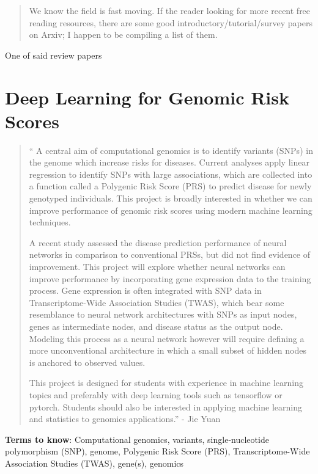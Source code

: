 \begin{quote}
We know the field is fast moving. If the reader looking for more recent free reading resources, there are some good introductory/tutorial/survey papers on Arxiv; I happen to be compiling a list of them.
\end{quote}

 One of said review papers \cite{raghu2020survey}

\cite[hello]{raghu2020survey}

\section{Deep Learning for Genomic Risk Scores}

\begin{quotation}
``
A central aim of computational genomics is to identify variants (SNPs) in the genome which increase risks for diseases. Current analyses apply linear regression to identify SNPs with large associations, which are collected into a function called a Polygenic Risk Score (PRS) to predict disease for newly genotyped individuals. This project is broadly interested in whether we can improve performance of genomic risk scores using modern machine learning techniques.

A recent study assessed the disease prediction performance of neural networks in comparison to conventional PRSs, but did not find evidence of improvement. This project will explore whether neural networks can improve performance by incorporating gene expression data to the training process. Gene expression is often integrated with SNP data in Transcriptome-Wide Association Studies (TWAS), which bear some resemblance to neural network architectures with SNPs as input nodes, genes as intermediate nodes, and disease status as the output node. Modeling this process as a neural network however will require defining a more unconventional architecture in which a small subset of hidden nodes is anchored to observed values.

This project is designed for students with experience in machine learning topics and preferably with deep learning tools such as tensorflow or pytorch. Students should also be interested in applying machine learning and statistics to genomics applications.'' - Jie Yuan
\end{quotation}

\textbf{Terms to know}: Computational genomics, variants, single-nucleotide polymorphism (SNP), genome, Polygenic Risk Score (PRS), Transcriptome-Wide Association Studies (TWAS), gene(s), genomics


